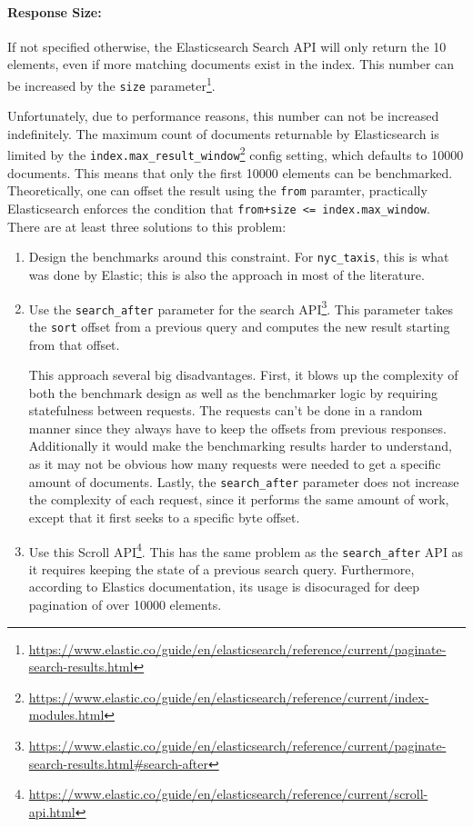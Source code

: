 \paragraph{Response Size:} If not specified otherwise, the Elasticsearch Search API will only return the 10 elements, even if more matching documents exist in the index. This number can be increased by the \texttt{size} parameter\footnote{\url{https://www.elastic.co/guide/en/elasticsearch/reference/current/paginate-search-results.html}}.

Unfortunately, due to performance reasons, this number can not be increased indefinitely. The maximum count of documents returnable by Elasticsearch is limited by the \texttt{index.max\_result\_window}\footnote{\url{https://www.elastic.co/guide/en/elasticsearch/reference/current/index-modules.html}} config setting, which defaults to 10000 documents. This means that only the first 10000 elements can be benchmarked. Theoretically, one can offset the result using the \texttt{from} paramter, practically Elasticsearch enforces the condition that \texttt{from+size <= index.max\_window}.\\

There are at least three solutions to this problem:
\begin{enumerate}
  \item Design the benchmarks around this constraint. For \texttt{nyc\_taxis}, this is what was done by Elastic; this is also the approach in most of the literature.
  \item Use the \texttt{search\_after} parameter for the search API\footnote{\url{https://www.elastic.co/guide/en/elasticsearch/reference/current/paginate-search-results.html\#search-after}}. This parameter takes the \texttt{sort} offset from a previous query and computes the new result starting from that offset.

    This approach several big disadvantages. First, it blows up the complexity of both the benchmark design as well as the benchmarker logic by requiring statefulness between requests. The requests can't be done in a random manner since they always have to keep the offsets from previous responses. Additionally it would make the benchmarking results harder to understand, as it may not be obvious how many requests were needed to get a specific amount of documents. Lastly, the \texttt{search\_after} parameter does not increase the complexity of each request, since it performs the same amount of work, except that it first seeks to a specific byte offset.

  \item Use this Scroll API\footnote{\url{https://www.elastic.co/guide/en/elasticsearch/reference/current/scroll-api.html}}. This has the same problem as the \texttt{search\_after} API as it requires keeping the state of a previous search query. Furthermore, according to Elastics documentation, its usage is disocuraged for deep pagination of over 10000 elements.
\end{enumerate}

